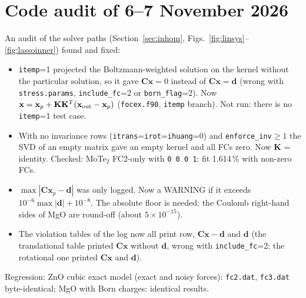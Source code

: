 \documentclass[11pt,a4paper]{article}
\newcommand{\bC}{\mathbf C}
\newcommand{\bK}{\mathbf K}
\newcommand{\bx}{\mathbf x}
\newcommand{\bd}{\mathbf d}
\newcommand{\code}[1]{\texttt{#1}}
\begin{document}
\section{Code audit of 6--7 November 2026}\label{sec:audit}
An audit of the solver paths (Section~\ref{sec:inhom}, Figs.~\ref{fig:linsys}--\ref{fig:lassoinner}) found and fixed:
\begin{itemize}
\item \code{itemp}=1 projected the Boltzmann-weighted solution on the kernel without the particular solution, so it
gave $\bC\bx=0$ instead of $\bC\bx=\bd$ (wrong with \code{stress.params}, \code{include\_fc}=2 or \code{born\_flag}=2). Now
$\bx=\bx_p+\bK\bK^T(\bx_{\rm out}-\bx_p)$ (\code{focex.f90}, \code{itemp} branch). Not run: there is no \code{itemp}=1 test case.
\item With no invariance rows (\code{itrans}=\code{irot}=\code{ihuang}=0) and \code{enforce\_inv}$\ge1$ the SVD of an empty matrix
gave an empty kernel and all FCs zero. Now $\bK$ = identity. Checked: MoTe$_2$ FC2-only with \code{0 0 0 1}: fit 1.614\,\%
with non-zero FCs.
\item $\max|\bC\bx_p-\bd|$ was only logged. Now a WARNING if it exceeds $10^{-6}\max|\bd|+10^{-8}$. The absolute floor is
needed: the Coulomb right-hand sides of MgO are round-off (about $5\times10^{-15}$).
\item The violation tables of the log now all print row, $\bC\bx-\bd$ and $\bd$ (the translational table printed $\bC\bx$
without $\bd$, wrong with \code{include\_fc}=2; the rotational one printed $\bC\bx$ and $\bd$).
\end{itemize}
Regression: ZnO cubic exact model (exact and noisy forces): \code{fc2.dat}, \code{fc3.dat} byte-identical; MgO with Born
charges: identical results.
\end{document}
